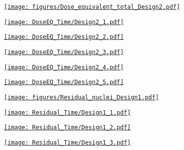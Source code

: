 \documentclass[xcolor={dvipsnames}]{beamer}
\begin{document}
\begin{frame}[plain]
 \hypertarget{Dose_equivalent_Design2}{\hyperlink{coolingtimesprev_Design2}{\texttt{[image: figures/Dose\_equivalent\_total\_Design2.pdf]}}}
\end{frame}
\begin{frame}[plain]
 \hypertarget{Dose_equivalent_minute_Design2}{\hyperlink{coolingtimesprev_Design2}{\texttt{[image: DoseEQ\_Time/Design2\_1.pdf]}}}
\end{frame}
\begin{frame}[plain]
 \hypertarget{Dose_equivalent_hour_Design2}{\hyperlink{coolingtimesprev_Design2}{\texttt{[image: DoseEQ\_Time/Design2\_2.pdf]}}}
\end{frame}
\begin{frame}[plain]
 \hypertarget{Dose_equivalent_day_Design2}{\hyperlink{coolingtimesprev_Design2}{\texttt{[image: DoseEQ\_Time/Design2\_3.pdf]}}}
\end{frame}
\begin{frame}[plain]
 \hypertarget{Dose_equivalent_month_Design2}{\hyperlink{coolingtimesprev_Design2}{\texttt{[image: DoseEQ\_Time/Design2\_4.pdf]}}}
\end{frame}
\begin{frame}[plain]
 \hypertarget{Dose_equivalent_year_Design2}{\hyperlink{coolingtimesprev_Design2}{\texttt{[image: DoseEQ\_Time/Design2\_5.pdf]}}}
\end{frame}
\begin{frame}[plain]
 \hypertarget{Residual_nuclei_Design1}{\hyperlink{residualtimesprev_Design1}{\texttt{[image: figures/Residual\_nuclei\_Design1.pdf]}}}
\end{frame}
\begin{frame}[plain]
 \hypertarget{Residual_nuclei_minute_Design1}{\hyperlink{residualtimesprev_Design1}{\texttt{[image: Residual\_Time/Design1\_1.pdf]}}}
\end{frame}
\begin{frame}[plain]
 \hypertarget{Residual_nuclei_hour_Design1}{\hyperlink{residualtimesprev_Design1}{\texttt{[image: Residual\_Time/Design1\_2.pdf]}}}
\end{frame}
\begin{frame}[plain]
 \hypertarget{Residual_nuclei_day_Design1}{\hyperlink{residualtimesprev_Design1}{\texttt{[image: Residual\_Time/Design1\_3.pdf]}}}
\end{frame}
\end{document}
